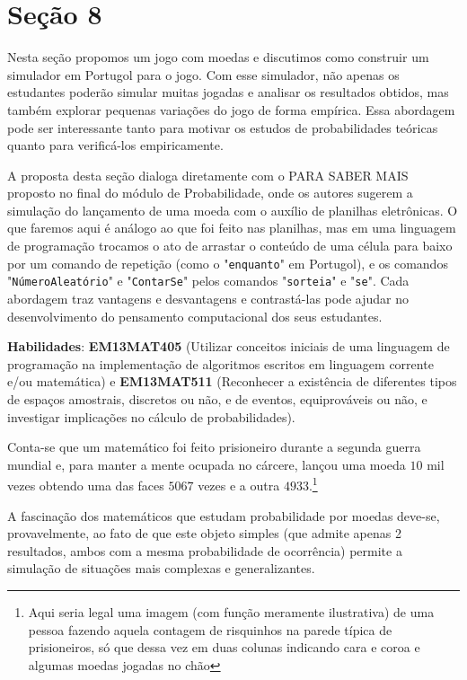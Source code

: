 \section{Seção 8}

\label{comp-exp8}
\begin{texto}
{
Nesta seção propomos um jogo com moedas e discutimos como construir um simulador em Portugol para o jogo. Com esse simulador, não apenas os estudantes poderão simular muitas jogadas e analisar os resultados obtidos, mas também explorar pequenas variações do jogo de forma empírica. Essa abordagem pode ser interessante tanto para motivar os estudos de probabilidades teóricas quanto para verificá-los empiricamente.

A proposta desta seção dialoga diretamente com o PARA SABER MAIS proposto no final do módulo de Probabilidade, onde os autores sugerem a simulação do lançamento de uma moeda com o auxílio de planilhas eletrônicas. O que faremos aqui é análogo ao que foi feito nas planilhas, mas em uma linguagem de programação trocamos o ato de arrastar o conteúdo de uma célula para baixo por um comando de repetição (como o "\texttt{enquanto}"{} em Portugol), e os comandos "\texttt{NúmeroAleatório}"{} e "\texttt{ContarSe}"{} pelos comandos "\texttt{sorteia}"{} e "\texttt{se}". Cada abordagem traz vantagens e desvantagens e contrastá-las pode ajudar no desenvolvimento do pensamento computacional dos seus estudantes.

\textbf{Habilidades}: \textbf{EM13MAT405} (Utilizar conceitos iniciais de uma linguagem de programação na implementação de algoritmos escritos em linguagem corrente e/ou matemática) e \textbf{EM13MAT511} (Reconhecer a existência de diferentes tipos de espaços amostrais, discretos ou não, e de eventos, equiprováveis ou não, e investigar implicações no cálculo de probabilidades).

}
\end{texto}


Conta-se que um matemático foi feito prisioneiro durante a segunda guerra mundial e, para manter a mente ocupada no cárcere, lançou uma moeda $10$ mil vezes obtendo uma das faces $5067$ vezes e a outra $4933$.\footnote{Aqui seria legal uma imagem (com função meramente ilustrativa) de uma pessoa fazendo aquela contagem de risquinhos na parede típica de prisioneiros, só que dessa vez em duas colunas indicando cara e coroa e algumas moedas jogadas no chão}

A fascinação dos matemáticos que estudam probabilidade por moedas deve-se, provavelmente, ao fato de que este objeto simples (que admite apenas 2 resultados, ambos com a mesma probabilidade de ocorrência) permite a simulação de situações mais complexas e generalizantes.

